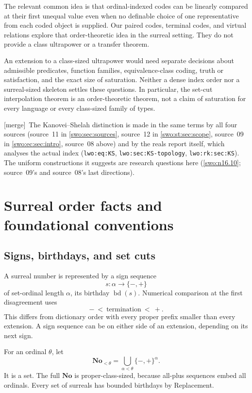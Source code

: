 \documentclass[11pt]{article}
\theoremstyle{definition}
\theoremstyle{remark}
\newcommand{\No}{\mathbf{No}}
\newcommand{\bd}{\operatorname{bd}}
\newcommand{\code}[1]{\texttt{\small #1}}
\newcommand{\merge}{\textsf{[merge]}}
\begin{document}
The relevant common idea is that ordinal-indexed codes can be linearly
compared at their first unequal value even when no definable choice of
one representative from each coded object is supplied. Our paired
codes, terminal codes, and virtual relations explore that order-theoretic
idea in the surreal setting. They do not provide a class ultrapower or
a transfer theorem.

An extension to a class-sized ultrapower would need separate decisions
about admissible predicates, function families, equivalence-class
coding, truth or satisfaction, and the exact size of saturation.
Neither a dense index order nor a surreal-sized skeleton settles these
questions. In particular, the set-cut interpolation theorem is an
order-theoretic theorem, not a claim of saturation for every language
or every class-sized family of types.


\merge\ The Kanovei--Shelah distinction is made in the same terms by all four
sources (source~11 in \cref{swo:sec:sources}, source~12 in
\cref{swo:st:sec:scope}, source~09 in \cref{swo:ec:sec:intro}, source~08
above) and by the reals report itself, which analyses the actual index
(\code{lwo:eq:KS}, \code{lwo:sec:KS-topology}, \code{lwo:rk:sec:KS}). The
uniform constructions it suggests are research questions here
(\cref{swo:n16.10}; source~09's and source~08's last directions).

\section{Surreal order facts and foundational conventions}\label{swo:sec:prelim}

\subsection{Signs, birthdays, and set cuts}

A surreal number is represented by a sign sequence
\[
 s:\alpha\longrightarrow\{-,+\}
\]
of set-ordinal length \(\alpha\), its birthday \(\bd(s)\). Numerical
comparison at the first disagreement uses
\[
 -\ <\ \text{termination}\ <\ +.
\]
This differs from dictionary order with every proper prefix smaller
than every extension. A sign sequence can be on either side of an
extension, depending on its next sign.

For an ordinal \(\theta\), let
\[
 \No_{<\theta}=\bigcup_{\alpha<\theta}\{-,+\}^{\alpha}.
\]
It is a set. The full \(\No\) is proper-class-sized, because all-plus
sequences embed all ordinals. Every set of surreals has bounded birthdays
by Replacement.
\end{document}
